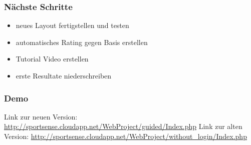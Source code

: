 \documentclass[]{beamer}
\begin{document}
\begin{frame}
	\frametitle{Nächste Schritte}
	\begin{itemize}
		\item neues Layout fertigstellen und testen
		\item automatisches Rating gegen Basis erstellen
		\item Tutorial Video erstellen
		\item erste Resultate niederschreiben
	\end{itemize}
\end{frame}

\begin{frame}
	\frametitle{Demo}
	Link zur neuen Version:
	\newline
\url{http://sportsense.cloudapp.net/WebProject/guided/Index.php}
\newline
\newline
	Link zur alten Version:	
	\newline
\url{http://sportsense.cloudapp.net/WebProject/without_login/Index.php}
\end{frame}
\end{document}

